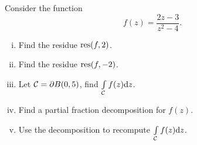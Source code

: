 \documentclass[12pt]{memoir}
\begin{document}
\begin{Ej}
    Consider the function 
    $$f(z)=\frac{2z-3}{z^2-4}.$$
    \begin{enumerate}[i)]
        \itemsep=-0.4em
        \item Find the residue $\operatorname*{res}(f,2)$.
        \item Find the residue $\operatorname*{res}(f,-2)$.
        \item Let $\mathcal{C}=\partial B(0,5)$, find $\int\limits_{\mathcal{C}} f(z)\dd z$. 
        \item Find a partial fraction decomposition for $f(z)$.
        \item Use the decomposition to recompute $\int\limits_{\mathcal{C}} f(z)\dd z$.
    \end{enumerate}
\end{Ej}
\end{document}
